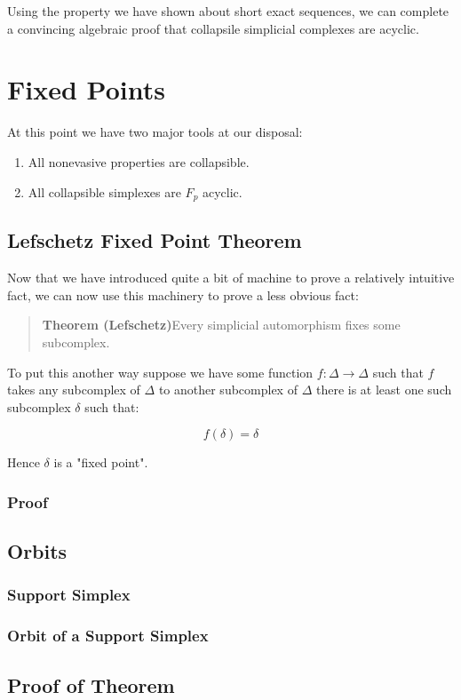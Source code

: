 \documentclass[letterpaper,12pt]{article}
\begin{document}
Using the property we have shown about short exact sequences, we can complete a convincing algebraic proof that collapsile simplicial complexes are acyclic.

\section{Fixed Points}

At this point we have two major tools at our disposal:

\begin{enumerate}
    \item{
            All nonevasive properties are collapsible.
        }
    \item{
            All collapsible simplexes are $F_p$ acyclic.
        }
\end{enumerate}


\subsection{Lefschetz Fixed Point Theorem}

Now that we have introduced quite a bit of machine to prove a relatively intuitive fact, we can now use this machinery to prove a less obvious fact:

\begin{quote}
    \textbf{Theorem (Lefschetz)}Every simplicial automorphism fixes some subcomplex.
\end{quote}

To put this another way suppose we have some function $f : \Delta \to \Delta$ such that $f$ takes any subcomplex of $\Delta$ to another subcomplex of $\Delta$ there is at least one such subcomplex $\delta$ such that:

$$f(\delta) = \delta$$

Hence $\delta$ is a "fixed point".

\subsubsection{Proof}

\subsection{Orbits}

\subsubsection{Support Simplex}

\subsubsection{Orbit of a Support Simplex}

\subsection{Proof of Theorem}
\end{document}
